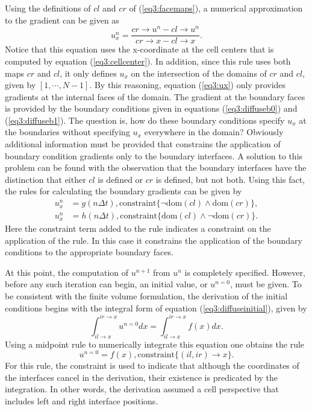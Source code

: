 Using the definitions of $cl$ and $cr$ of (\ref{eq3:facemaps}), a
numerical approximation to the gradient can be given as
\begin{equation}
u_x^n = \frac{cr\rightarrow u^n - cl\rightarrow u^n}
           {cr\rightarrow x - cl\rightarrow x}.
\label{eq3:ux}
\end{equation}
Notice that this equation uses the x-coordinate at the cell centers
that is computed by equation (\ref{eq3:cellcenter}).  In addition,
since this rule uses both maps $cr$ and $cl$, it only defines $u_x$ on
the intersection of the domains of $cr$ and $cl$, given by $[1, \cdots,
N-1]$.  By this reasoning, equation (\ref{eq3:ux}) only provides
gradients at the internal faces of the domain.  The gradient at the
boundary faces is provided by the boundary conditions given in
equations (\ref{eq3:diffuseb0}) and (\ref{eq3:diffuseb1}).  The
question is, how do these boundary conditions specify $u_x$ at the
boundaries without specifying $u_x$ everywhere in the domain?
Obviously additional information must be provided that constrains
the application of boundary condition gradients only to the boundary
interfaces.  A solution to this problem can be found with the
observation that the boundary interfaces have the distinction that
either $cl$ is defined or $cr$ is defined, but not both.  Using this
fact, the rules for calculating the boundary gradients can be given by
\begin{eqnarray}
u_x^n & = g(n \Delta t), \mbox{constraint}\lbrace \neg \mathrm{dom}(cl) \wedge
\mathrm{dom}(cr) \rbrace, \label{eq3:brule0}\\
u_x^n & = h(n \Delta t), \mbox{constraint}\lbrace \mathrm{dom}(cl)
\wedge \neg \mathrm{dom}(cr) \rbrace.\label{eq3:brule1}
\end{eqnarray}
Here the constraint term added to the rule indicates a constraint on
the application of the rule.  In this case it constrains the
application of the boundary conditions to the appropriate boundary faces.

At this point, the computation of $u^{n+1}$ from $u^n$ is completely
specified.  However, before any such iteration can begin, an initial
value, or $u^{n=0}$, must be given.  To be consistent with the finite
volume formulation, the derivation of the initial conditions begins
with the integral form of equation (\ref{eq3:diffuseinitial}), given by
\begin{equation}
\int^{ir\rightarrow x}_{il\rightarrow x} u^{n=0} dx =
\int^{ir\rightarrow x}_{il\rightarrow x} f(x) dx.
\end{equation}
Using a midpoint rule to numerically integrate this equation one
obtains the rule
\begin{equation}
u^{n=0} = f(x), \mbox{constraint}\lbrace (il,ir)\rightarrow x\rbrace.
\label{eq3:ic}
\end{equation}
For this rule, the constraint is used to indicate that although the
coordinates of the interfaces cancel in the derivation, their
existence is predicated by the integration.  In other words, the
derivation assumed a cell perspective that includes left and right
interface positions.

